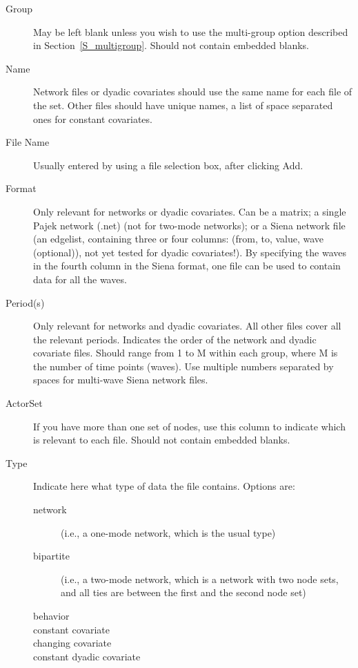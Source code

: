 \documentclass[a4paper,fleqn,11pt]{article}
\newcommand{\+}{\, + \,}
\newcommand{\sfn}[1]{\textsf{#1}}
\begin{document}
{\begin{description}
\item[\sfn{Group}] May be left blank unless you wish to use the
  \sfn{multi-group} option described in Section~\ref{S_multigroup}. Should not
  contain embedded blanks.
\item[\sfn{Name}] Network files or dyadic covariates should use the same name
  for each file of the set. Other files should have unique names, a list of
  space separated ones for constant covariates.
\item[\sfn{File Name}] Usually entered by using a file selection box, after
  clicking \sfn{Add}.
\item[\sfn{Format}] Only relevant for networks or dyadic covariates. Can be
  a matrix; a single
  Pajek network (\sfn{.net}) (not for two-mode networks);
  or a \sfn{Siena network file} (an edgelist,
  containing three or four columns: (from, to, value, wave (optional)), not yet
  tested for dyadic covariates!).
  By specifying the waves in the fourth column in the \sfn{Siena} format,
  one file can be used to contain data for all the waves.
\item[\sfn{Period(s)}] Only relevant for networks and dyadic covariates. All
  other files cover all the relevant periods. Indicates the order of the network
  and dyadic covariate files. Should range from 1 to \sfn{M} within each
  \sfn{group}, where \sfn{M} is the number of time points (waves).
  Use multiple numbers separated by spaces for multi-wave Siena
  network files.
\item[\sfn{ActorSet}] If you have more than one set of nodes, use this column to
  indicate which is relevant to each file. Should not contain embedded blanks.
\item[\sfn{Type}] Indicate here what type of data the file contains. Options
  are:
\begin{description}
\item[\sfn{network}] (i.e., a one-mode network, which is the
     usual type)
\item[\sfn{bipartite}] (i.e., a two-mode network, which is a network with two
    node sets, and all ties are between the first and the second node set)
\item[\sfn{behavior}]
\item[\sfn{constant covariate}]
\item[\sfn{changing covariate}]
\item[\sfn{constant dyadic covariate}]

\end{description}
\end{description}}
\end{document}
